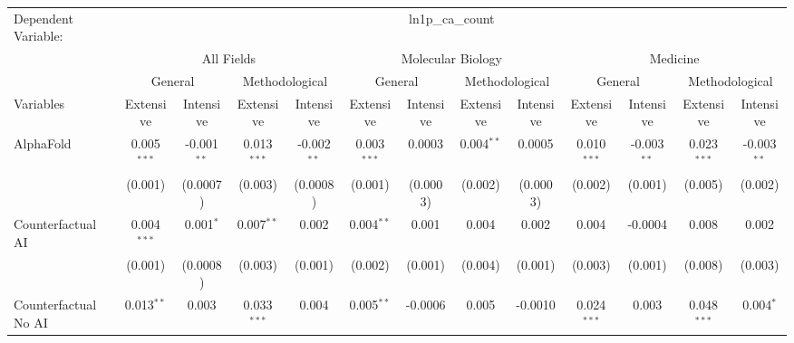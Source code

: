 \begingroup
\centering
\begin{tabular}{lcccccccccccc}
   \tabularnewline \midrule \midrule
   Dependent Variable: & \multicolumn{12}{c}{ln1p\_ca\_count}\\
 & \multicolumn{4}{c}{All Fields} & \multicolumn{4}{c}{Molecular Biology} & \multicolumn{4}{c}{Medicine} \\
\cmidrule(lr){2-5} \cmidrule(lr){6-9} \cmidrule(lr){10-13}
 & \multicolumn{2}{c}{General} & \multicolumn{2}{c}{Methodological} & \multicolumn{2}{c}{General} & \multicolumn{2}{c}{Methodological} & \multicolumn{2}{c}{General} & \multicolumn{2}{c}{Methodological} \\
\cmidrule(lr){2-3} \cmidrule(lr){4-5} \cmidrule(lr){6-7} \cmidrule(lr){8-9} \cmidrule(lr){10-11} \cmidrule(lr){12-13}
Variables & \multicolumn{1}{c}{Extensive} & \multicolumn{1}{c}{Intensive} & \multicolumn{1}{c}{Extensive} & \multicolumn{1}{c}{Intensive} & \multicolumn{1}{c}{Extensive} & \multicolumn{1}{c}{Intensive} & \multicolumn{1}{c}{Extensive} & \multicolumn{1}{c}{Intensive} & \multicolumn{1}{c}{Extensive} & \multicolumn{1}{c}{Intensive} & \multicolumn{1}{c}{Extensive} & \multicolumn{1}{c}{Intensive} \\
\cmidrule(lr){1-1}\cmidrule(lr){2-2} \cmidrule(lr){3-3} \cmidrule(lr){4-4} \cmidrule(lr){5-5} \cmidrule(lr){6-6} \cmidrule(lr){7-7} \cmidrule(lr){8-8} \cmidrule(lr){9-9} \cmidrule(lr){10-10} \cmidrule(lr){11-11} \cmidrule(lr){12-12} \cmidrule(lr){13-13}
   AlphaFold                                & 0.005$^{***}$ & -0.001$^{**}$   & 0.013$^{***}$ & -0.002$^{**}$   & 0.003$^{***}$ & 0.0003    & 0.004$^{**}$ & 0.0005    & 0.010$^{***}$ & -0.003$^{**}$ & 0.023$^{***}$ & -0.003$^{**}$\\   
                                            & (0.001)       & (0.0007)        & (0.003)       & (0.0008)        & (0.001)       & (0.0003)  & (0.002)      & (0.0003)  & (0.002)       & (0.001)       & (0.005)       & (0.002)\\   
   Counterfactual AI                        & 0.004$^{***}$ & 0.001$^{*}$     & 0.007$^{**}$  & 0.002           & 0.004$^{**}$  & 0.001     & 0.004        & 0.002     & 0.004         & -0.0004       & 0.008         & 0.002\\   
                                            & (0.001)       & (0.0008)        & (0.003)       & (0.001)         & (0.002)       & (0.001)   & (0.004)      & (0.001)   & (0.003)       & (0.001)       & (0.008)       & (0.003)\\   
   Counterfactual No AI                     & 0.013$^{**}$  & 0.003           & 0.033$^{***}$ & 0.004           & 0.005$^{**}$  & -0.0006   & 0.005        & -0.0010   & 0.024$^{***}$ & 0.003         & 0.048$^{***}$ & 0.004$^{*}$\\   

\end{tabular}
